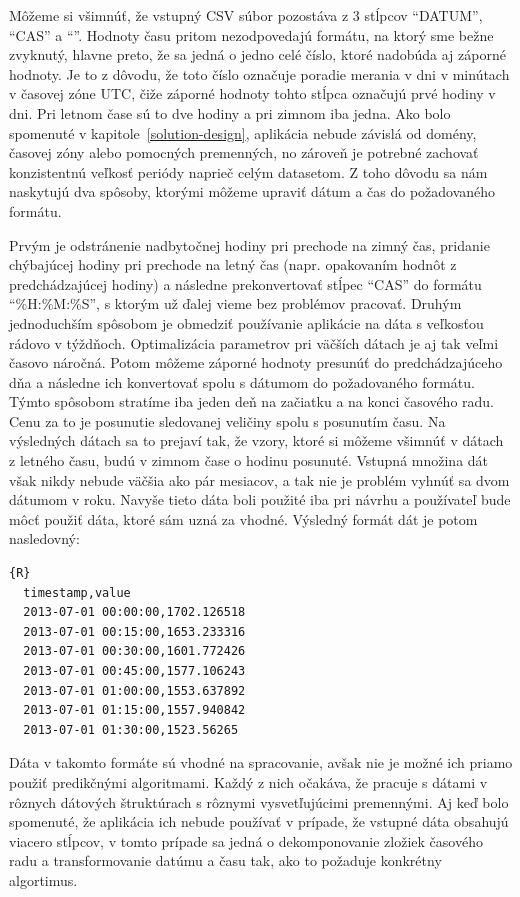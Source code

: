 \documentclass[a4paper,slovak,12pt,appendix]{article}
\begin{document}
Môžeme si všimnúť, že vstupný CSV súbor pozostáva z 3 stĺpcov ``DATUM'', ``CAS''
a ``''. Hodnoty času pritom nezodpovedajú formátu, na ktorý sme
bežne zvyknutý, hlavne preto, že sa jedná o jedno celé číslo, ktoré nadobúda aj
záporné hodnoty. Je to z dôvodu, že toto číslo označuje poradie merania v dni
v minútach v časovej zóne UTC, čiže záporné hodnoty tohto stĺpca označujú prvé
hodiny v dni. Pri letnom čase sú to dve hodiny a pri zimnom iba jedna. Ako bolo
spomenuté v kapitole~\ref{solution-design}, aplikácia nebude závislá od domény,
časovej zóny alebo pomocných premenných, no zároveň je potrebné zachovať
konzistentnú veľkosť periódy naprieč celým datasetom. Z toho dôvodu sa nám
naskytujú dva spôsoby, ktorými môžeme upraviť dátum a čas do požadovaného
formátu.

Prvým je odstránenie nadbytočnej hodiny pri prechode na zimný čas,
pridanie chýbajúcej hodiny pri prechode na letný čas (napr. opakovaním hodnôt
z predchádzajúcej hodiny) a následne prekonvertovať stĺpec ``CAS'' do formátu
``\%H:\%M:\%S'', s ktorým už ďalej vieme bez problémov pracovať. Druhým
jednoduchším spôsobom je obmedziť používanie aplikácie na dáta s veľkosťou
rádovo v týždňoch. Optimalizácia parametrov pri väčších dátach je aj tak veľmi
časovo náročná. Potom môžeme záporné hodnoty presunúť do predchádzajúceho dňa
a následne ich konvertovať spolu s dátumom do požadovaného formátu. Týmto
spôsobom stratíme iba jeden deň na začiatku a na konci časového radu. Cenu za
to je posunutie sledovanej veličiny spolu s posunutím času. Na výsledných dátach
sa to prejaví tak, že vzory, ktoré si môžeme všimnúť v dátach z letného času,
budú v zimnom čase o hodinu posunuté. Vstupná množina dát však nikdy nebude
väčšia ako pár mesiacov, a tak nie je problém vyhnúť sa dvom dátumom v roku.
Navyše tieto dáta boli použité iba pri návrhu a používateľ bude môcť použiť
dáta, ktoré sám uzná za vhodné. Výsledný formát dát je potom nasledovný:

\begin{lstlisting}{R}
  timestamp,value
  2013-07-01 00:00:00,1702.126518
  2013-07-01 00:15:00,1653.233316
  2013-07-01 00:30:00,1601.772426
  2013-07-01 00:45:00,1577.106243
  2013-07-01 01:00:00,1553.637892
  2013-07-01 01:15:00,1557.940842
  2013-07-01 01:30:00,1523.56265
\end{lstlisting}

Dáta v takomto formáte sú vhodné na spracovanie, avšak nie je možné ich priamo
použiť predikčnými algoritmami. Každý z nich očakáva, že pracuje s dátami
v rôznych dátových štruktúrach s rôznymi vysvetľujúcimi premennými. Aj keď bolo
spomenuté, že aplikácia ich nebude používať v prípade, že vstupné dáta obsahujú
viacero stĺpcov, v tomto prípade sa jedná o dekomponovanie zložiek časového radu
a transformovanie datúmu a času tak, ako to požaduje konkrétny algortimus.
\end{document}
